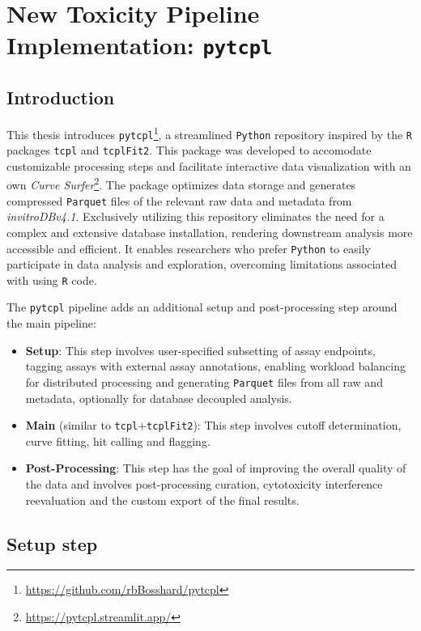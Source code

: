 \section{New Toxicity Pipeline Implementation: \texttt{pytcpl}}\label{sec:pytcpl}
\subsection{Introduction} 
This thesis introduces \texttt{pytcpl}\footnote{\url{https://github.com/rbBosshard/pytcpl}}, a streamlined \texttt{Python} repository inspired by the \texttt{R} packages \texttt{tcpl} and \texttt{tcplFit2}. This package was developed to accomodate customizable processing steps and facilitate interactive data visualization with an own \emph{Curve Surfer}\footnote{\url{https://pytcpl.streamlit.app/}}. The package optimizes data storage and generates compressed \texttt{Parquet} files of the relevant raw data and metadata from \emph{invitroDBv4.1}. Exclusively utilizing this repository eliminates the need for a complex and extensive database installation, rendering downstream analysis more accessible and efficient. It enables researchers who prefer \texttt{Python} to easily participate in data analysis and exploration, overcoming limitations associated with using \texttt{R} code.

The \texttt{pytcpl} pipeline adds an additional setup and post-processing step around the main pipeline:
\begin{itemize}
    \item \textbf{Setup}: This step involves user-specified subsetting of assay endpoints, tagging assays with external assay annotations, enabling workload balancing for distributed processing and generating \texttt{Parquet} files from all raw and metadata, optionally for database decoupled analysis.
    \item \textbf{Main} (similar to \texttt{tcpl}+\texttt{tcplFit2}): This step involves cutoff determination, curve fitting, hit calling and flagging.
    \item \textbf{Post-Processing}: This step has the goal of improving the overall quality of the data and involves post-processing curation, cytotoxicity interference reevaluation and the custom export of the final results.
\end{itemize}

\subsection{Setup step}\label{sec:subset_data}
